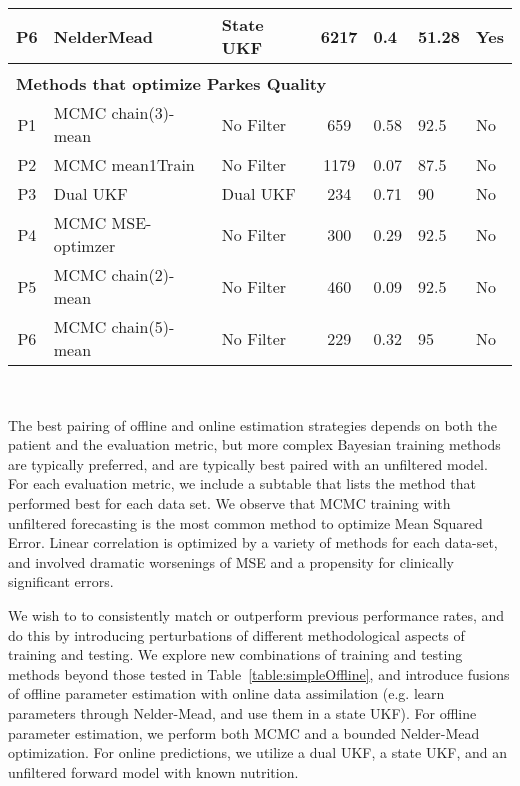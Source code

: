 \documentclass[10pt,letterpaper]{article}
\begin{document}
\begin{table}[!ht]
\begin{adjustwidth}{-2.25in}{0in}
\begin{tabular}{|c|l|l|c|l|p{2cm}|p{2cm}|}
P6 & NelderMead & State UKF & 6217 & 0.4 & 51.28 & Yes \\
\hline \hline
\multicolumn{7}{|l|}{}\\
\multicolumn{7}{|l|}{\textbf{Methods that optimize Parkes Quality}}\\
\hline
P1 & MCMC chain(3)-mean & No Filter & 659 & 0.58 & 92.5 & No \\
P2 & MCMC mean1Train & No Filter & 1179 & 0.07 & 87.5 & No \\
P3 & Dual UKF & Dual UKF & 234 & 0.71 & 90 & No \\
P4 & MCMC MSE-optimzer & No Filter & 300 & 0.29 & 92.5 & No \\
P5 & MCMC chain(2)-mean & No Filter & 460 & 0.09 & 92.5 & No \\
P6 & MCMC chain(5)-mean & No Filter & 229 & 0.32 & 95 & No \\
\hline
\end{tabular} \\
\begin{flushleft} The best pairing of offline and online estimation strategies depends on both the patient and the evaluation metric, but more complex Bayesian training methods are typically preferred, and are typically best paired with an unfiltered model. For each evaluation metric, we include a subtable that lists the method that performed best for each data set. We observe that MCMC training with unfiltered forecasting is the most common method to optimize Mean Squared Error. Linear correlation is optimized by a variety of methods for each data-set, and involved dramatic worsenings of MSE and a propensity for clinically significant errors.
\end{flushleft}
\end{adjustwidth}
\end{table}


We wish to to consistently match or outperform previous performance rates, and do this by introducing perturbations of different methodological aspects of training and testing.  We explore new combinations of training and testing methods beyond those tested in Table~\ref{table:simpleOffline}, and introduce fusions of offline parameter estimation with online data assimilation (e.g. learn parameters through Nelder-Mead, and use them in a state UKF). 
For offline parameter estimation, we perform both MCMC and a bounded Nelder-Mead optimization.
For online predictions, we utilize a dual UKF, a state UKF, and an unfiltered forward model with known nutrition. 
\end{document}
